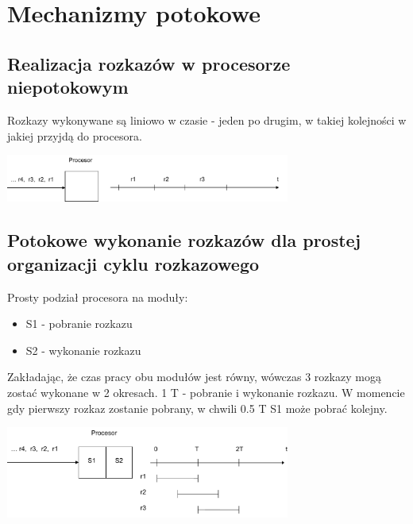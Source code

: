 \newpage
\section{Mechanizmy potokowe}
	\subsection{Realizacja rozkazów w procesorze niepotokowym}
		Rozkazy wykonywane są liniowo w czasie - jeden po drugim, w takiej kolejności w jakiej przyjdą do procesora.
		\begin{center}
			\includegraphics[width=0.7\textwidth]{./images/potok01}
		\end{center}
   	\subsection{Potokowe wykonanie rozkazów dla prostej organizacji cyklu rozkazowego}
   		Prosty podział procesora na moduły:
	   	\begin{itemize}
	   		\item S1 - pobranie rozkazu
	   		\item S2 - wykonanie rozkazu
	   	\end{itemize}
   		Zakładając, że czas pracy obu modułów jest równy, wówczas 3 rozkazy mogą zostać wykonane w 2 okresach. 1 T - pobranie i wykonanie rozkazu. W momencie gdy pierwszy rozkaz zostanie pobrany, w chwili 0.5 T S1 może pobrać kolejny.
   		\begin{center}
   			\includegraphics[width=0.7\textwidth]{./images/potok02}
   		\end{center}

